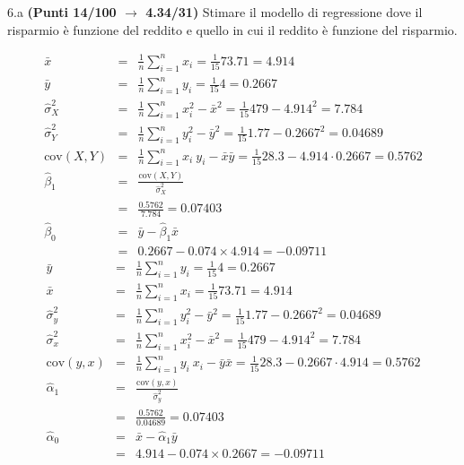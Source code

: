 \documentclass[
  11pt,
]{book}
\theoremstyle{mytheoremstyle}
\theoremstyle{mydefstyle}
\newenvironment{sol}
  {
  \begin{tcolorbox}[enhanced,breakable,arc=0.1mm,boxrule=1pt,colback=white,colframe=iblue,
  title=\bf \fontfamily{lmss}\selectfont \hspace{.5 cm} Soluzione,drop fuzzy shadow]

}{
\end{tcolorbox}
  }
\begin{document}
6.a \textbf{(Punti 14/100 \(\rightarrow\) 4.34/31)} Stimare il modello di regressione dove il risparmio è funzione del reddito e quello in cui il reddito è funzione del risparmio.

\begin{sol}
\begin{eqnarray*}
           \bar x &=&\frac 1 n\sum_{i=1}^n x_i = \frac {1}{ 15 }  73.71 =  4.914 \\
           \bar y &=&\frac 1 n\sum_{i=1}^n y_i = \frac {1}{ 15 }  4 =  0.2667 \\
           \hat\sigma_X^2&=&\frac 1 n\sum_{i=1}^n x_i^2-\bar x^2=\frac {1}{ 15 }  479  - 4.914 ^2= 7.784 \\
           \hat\sigma_Y^2&=&\frac 1 n\sum_{i=1}^n y_i^2-\bar y^2=\frac {1}{ 15 }  1.77  - 0.2667 ^2= 0.04689 \\
           \text{cov}(X,Y)&=&\frac 1 n\sum_{i=1}^n x_i~y_i-\bar x\bar y=\frac {1}{ 15 }  28.3 - 4.914 \cdot 0.2667 = 0.5762 \\
           \hat\beta_1 &=& \frac{\text{cov}(X,Y)}{\hat\sigma_X^2} \\
                    &=& \frac{ 0.5762 }{ 7.784 }  =  0.07403 \\
           \hat\beta_0 &=& \bar y - \hat\beta_1 \bar x\\
                    &=&  0.2667 - 0.074 \times  4.914 = -0.09711 
         \end{eqnarray*}\begin{eqnarray*}
\bar y &=&\frac 1 n\sum_{i=1}^n y_i = \frac {1}{ 15 }  4 =  0.2667 \\
\bar x &=&\frac 1 n\sum_{i=1}^n x_i = \frac {1}{ 15 }  73.71 =  4.914 \\
\hat\sigma_y^2&=&\frac 1 n\sum_{i=1}^n y_i^2-\bar y^2=\frac {1}{ 15 }  1.77  - 0.2667 ^2= 0.04689 \\
\hat\sigma_x^2&=&\frac 1 n\sum_{i=1}^n x_i^2-\bar x^2=\frac {1}{ 15 }  479  - 4.914 ^2= 7.784 \\
\text{cov}(y,x)&=&\frac 1 n\sum_{i=1}^n y_i~x_i-\bar y\bar x=\frac {1}{ 15 }  28.3 - 0.2667 \cdot 4.914 = 0.5762 \\
\hat\alpha_1 &=& \frac{\text{cov}(y,x)}{\hat\sigma_y^2} \\
         &=& \frac{ 0.5762 }{ 0.04689 }  =  0.07403 \\
\hat\alpha_0 &=& \bar x - \hat\alpha_1 \bar y\\
         &=&  4.914 - 0.074 \times  0.2667 = -0.09711 
\end{eqnarray*}

\end{sol}
\end{document}
